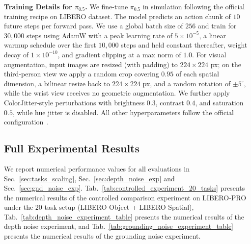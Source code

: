 \noindent\textbf{Training Details for $\pi_{0.5}$.}
We fine-tune $\pi_{0.5}$ in simulation following the official training recipe on LIBERO dataset. The model predicts an action chunk of $10$ future steps per forward pass. We use a global batch size of $256$ and train for $30{,}000$ steps using AdamW with a peak learning rate of $5{\times}10^{-5}$, a linear warmup schedule over the first $10{,}000$ steps and held constant thereafter, weight decay of $1{\times}10^{-10}$, and gradient clipping at a max norm of $1.0$. For visual augmentation, input images are resized (with padding) to $224{\times}224$ px; on the third-person view we apply a random crop covering $0.95$ of each spatial dimension, a bilinear resize back to $224{\times}224$ px, and a random rotation of $\pm 5^{\circ}$, while the wrist view receives no geometric augmentation. We further apply ColorJitter-style perturbations with brightness $0.3$, contrast $0.4$, and saturation $0.5$, while hue jitter is disabled. All other hyperparameters follow the official configuration~\cite{pi05}.


\subsection{Full Experimental Results}
\label{supp:sec:subsec:sim-experimental-results-details}



We report numerical performance values for all evaluations in Sec.~\ref{sec:tasks_scaling}, Sec.~\ref{sec:depth_noise_exp} and Sec.~\ref{sec:gnd_noise_exp}. Tab.~\ref{tab:controlled_experiment_20_tasks} presents the numerical results of the controlled comparison experiment on LIBERO-PRO under the 20-task setup (LIBERO-Object + LIBERO-Spatial), Tab.~\ref{tab:depth_noise_experiment_table} presents the numerical results of the depth noise experiment, and Tab.~\ref{tab:grounding_noise_experiment_table} presents the numerical results of the grounding noise experiment.